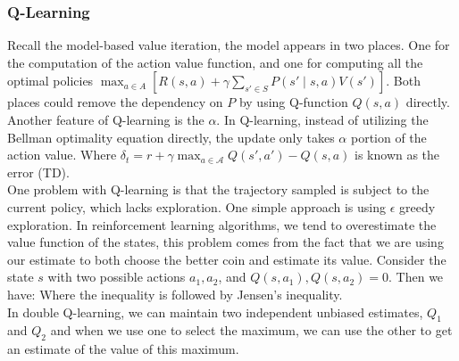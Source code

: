 \documentclass[10pt]{report}
\begin{document}
\subsubsection{Q-Learning}
Recall the model-based value iteration, the model appears in two places. One for the computation of the action value function,
and one for computing all the optimal policies $\max_{a\in A}\left[R(s,a)+\gamma\sum_{s'\in S}P(s'\mid s,a)V(s')\right]$. Both
places could remove the dependency on $P$ by using Q-function $Q(s,a)$ directly.\\
Another feature of Q-learning is the  $\alpha$. In Q-learning, instead of utilizing the Bellman optimality equation directly,
the update only takes $\alpha$ portion of the action value.
Where $\delta_t=r+\gamma\max_{a\in\mathcal{A}}Q(s',a')-Q(s,a)$ is known as the  error (TD).\\
One problem with Q-learning is that the trajectory sampled is subject to the current policy, which lacks exploration. One simple approach is
using $\epsilon$ greedy exploration.
In reinforcement learning algorithms, we tend to overestimate the value function of the states, this problem comes from the fact that we are using our estimate to both choose the
better coin and estimate its value. Consider the state $s$ with two possible actions $a_1, a_2$, and $Q(s,a_1),Q(s,a_2)=0$. Then we have:
Where the inequality is followed by Jensen's inequality.\\
In double Q-learning, we can maintain two independent unbiased estimates, $Q_1$ and $Q_2$ and when we use one to select the maximum, we can use the other to get an estimate of the value of this maximum.
\end{document}
